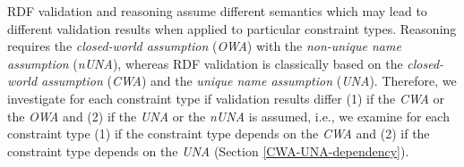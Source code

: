 \documentclass{acm_proc_article-sp}
\begin{document}
RDF validation and reasoning assume different semantics which may lead to different validation results when applied to particular constraint types. %
Reasoning requires the {\em closed-world assumption} (\emph{OWA}) with the {\em non-unique name assumption} (\emph{nUNA}), 
whereas RDF validation is classically based on the {\em closed-world assumption} (\emph{CWA}) and the {\em unique name assumption} (\emph{UNA}).
Therefore, we investigate for each constraint type if validation results differ (1) if the \emph{CWA} or the \emph{OWA} and (2) if the \emph{UNA} or the \emph{nUNA}
is assumed, i.e., we examine for each constraint type (1) if the constraint type depends on the \emph{CWA} and (2) if the constraint type depends on the \emph{UNA} (Section \ref{CWA-UNA-dependency}).
\end{document}
